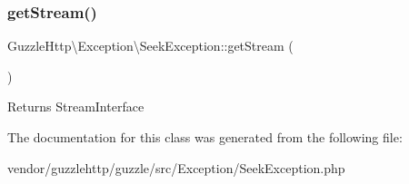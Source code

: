 \subsubsection{\texorpdfstring{get\+Stream()}{getStream()}}
{\footnotesize\ttfamily Guzzle\+Http\textbackslash{}\+Exception\textbackslash{}\+Seek\+Exception\+::get\+Stream (\begin{DoxyParamCaption}{ }\end{DoxyParamCaption})}

\begin{DoxyReturn}{Returns}
Stream\+Interface 
\end{DoxyReturn}


The documentation for this class was generated from the following file\+:\begin{DoxyCompactItemize}
\item 
vendor/guzzlehttp/guzzle/src/\+Exception/Seek\+Exception.\+php\end{DoxyCompactItemize}
